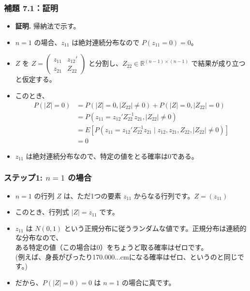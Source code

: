 \documentclass{beamer}
\begin{document}
\begin{frame}
\frametitle{補題 7.1：証明}
\begin{itemize}
    \item \textbf{証明.} 帰納法で示す。
    \item $n=1$ の場合、$z_{11}$ は絶対連続分布なので $P(z_{11}=0)=0$。
    \item $Z$ を $Z=\begin{pmatrix}z_{11}&z_{12}'\\ z_{21}&Z_{22}\end{pmatrix}$ と分割し、$Z_{22}\in\mathbb{R}^{(n-1)\times(n-1)}$ で結果が成り立つと仮定する。
    \item このとき、
    \begin{align*}
        P(|Z|=0) &= P(|Z|=0,|Z_{22}|\ne0) + P(|Z|=0,|Z_{22}|=0) \\
        &= P(z_{11}=z_{12}'Z_{22}^{-1}z_{21},|Z_{22}|\ne0) \\
        &= E[P(z_{11}=z_{12}'Z_{22}^{-1}z_{21} \mid z_{12},z_{21},Z_{22},|Z_{22}|\ne0)] \\
        &= 0
    \end{align*}
    \item $z_{11}$ は絶対連続分布なので、特定の値をとる確率は0である。
\end{itemize}
\end{frame}




\begin{frame}
\frametitle{ステップ1: $n=1$ の場合}
\begin{itemize}
    \item $n=1$ の行列 $Z$ は、ただ1つの要素 $z_{11}$ からなる行列です。$Z=(z_{11})$
    \item このとき、行列式 $|Z|=z_{11}$ です。
    \item $z_{11}$ は $N(0,1)$ という正規分布に従うランダムな値です。正規分布は連続的な分布なので、\\ある特定の値（この場合は0）をちょうど取る確率はゼロです。\\(例えば、身長がぴったり170.000...cmになる確率はゼロ、というのと同じです。)
    \item だから、$P(|Z|=0)=0$ は $n=1$ の場合に真です。
\end{itemize}
\end{frame}
\end{document}
